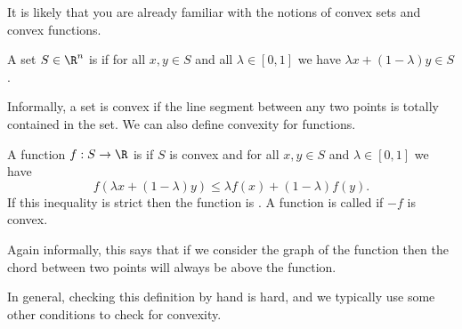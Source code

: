 \documentclass[a4paper]{scrartcl}
\begin{document}
It is likely that you are already familiar with the notions of convex sets and convex functions.

\begin{definition}
    A set $S \in \R^n$ is  if for all $x, y \in S$ and all $\lambda \in [0, 1]$ we have $\lambda x + (1 - \lambda) y \in S$.
\end{definition}

Informally, a set is convex if the line segment between any two points is totally contained in the set. We can also define convexity for functions.

\begin{definition}
    A function $f: S \rightarrow \R$ is  if $S$ is convex and for all $x, y \in S$ and $\lambda \in [0, 1]$ we have
    $$
    f(\lambda x + (1 - \lambda) y) \leq \lambda f(x) + (1 - \lambda) f(y).
    $$
    If this inequality is strict then the function is . A function is called  if $-f$ is convex.
\end{definition}

Again informally, this says that if we consider the graph of the function then the chord between two points will always be above the function.

In general, checking this definition by hand is hard, and we typically use some other conditions to check for convexity.
\end{document}
